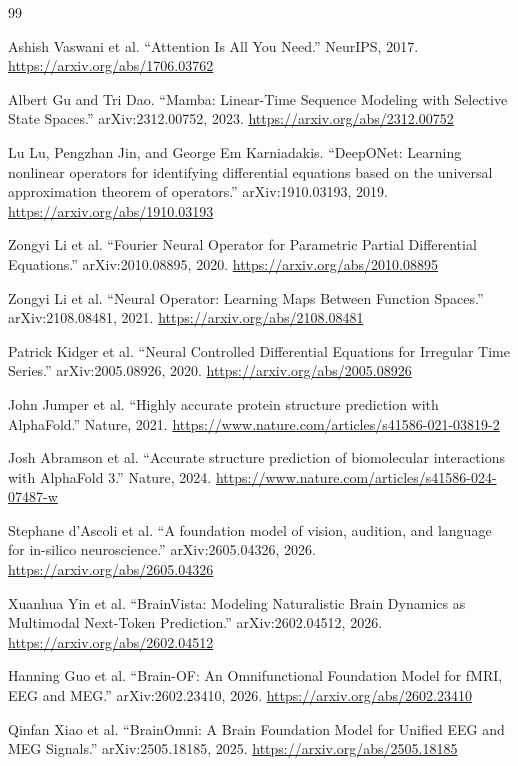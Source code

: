 \documentclass[11pt]{article}
\begin{document}
\begin{thebibliography}{99}

Ashish Vaswani et al. ``Attention Is All You Need.'' NeurIPS, 2017. \url{https://arxiv.org/abs/1706.03762}

Albert Gu and Tri Dao. ``Mamba: Linear-Time Sequence Modeling with Selective State Spaces.'' arXiv:2312.00752, 2023. \url{https://arxiv.org/abs/2312.00752}

Lu Lu, Pengzhan Jin, and George Em Karniadakis. ``DeepONet: Learning nonlinear operators for identifying differential equations based on the universal approximation theorem of operators.'' arXiv:1910.03193, 2019. \url{https://arxiv.org/abs/1910.03193}

Zongyi Li et al. ``Fourier Neural Operator for Parametric Partial Differential Equations.'' arXiv:2010.08895, 2020. \url{https://arxiv.org/abs/2010.08895}

Zongyi Li et al. ``Neural Operator: Learning Maps Between Function Spaces.'' arXiv:2108.08481, 2021. \url{https://arxiv.org/abs/2108.08481}

Patrick Kidger et al. ``Neural Controlled Differential Equations for Irregular Time Series.'' arXiv:2005.08926, 2020. \url{https://arxiv.org/abs/2005.08926}

John Jumper et al. ``Highly accurate protein structure prediction with AlphaFold.'' Nature, 2021. \url{https://www.nature.com/articles/s41586-021-03819-2}

Josh Abramson et al. ``Accurate structure prediction of biomolecular interactions with AlphaFold 3.'' Nature, 2024. \url{https://www.nature.com/articles/s41586-024-07487-w}

Stephane d'Ascoli et al. ``A foundation model of vision, audition, and language for in-silico neuroscience.'' arXiv:2605.04326, 2026. \url{https://arxiv.org/abs/2605.04326}

Xuanhua Yin et al. ``BrainVista: Modeling Naturalistic Brain Dynamics as Multimodal Next-Token Prediction.'' arXiv:2602.04512, 2026. \url{https://arxiv.org/abs/2602.04512}

Hanning Guo et al. ``Brain-OF: An Omnifunctional Foundation Model for fMRI, EEG and MEG.'' arXiv:2602.23410, 2026. \url{https://arxiv.org/abs/2602.23410}

Qinfan Xiao et al. ``BrainOmni: A Brain Foundation Model for Unified EEG and MEG Signals.'' arXiv:2505.18185, 2025. \url{https://arxiv.org/abs/2505.18185}


\end{thebibliography}
\end{document}
